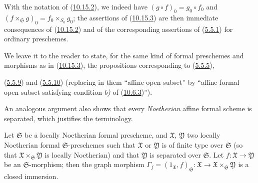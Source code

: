 With the notation of (\hyperref[I.10.15.2]{10.15.2}), we indeed have
$(g\circ f)_0=g_0\circ f_0$ and
$(f\times_{\mathfrak{S}}g)_0=f_0\times_{S_0}g_0$; the assertions of
(\hyperref[I.10.15.3]{10.15.3}) are then immediate consequences of
(\hyperref[I.10.15.2]{10.15.2}) and of the corresponding assertions of
(\hyperref[I.5.5.1]{5.5.1}) for ordinary preschemes.

We leave it to the reader to state, for the same kind of
formal preschemes and morphisms as in
(\hyperref[I.10.15.3]{10.15.3}), the propositions corresponding to
(\hyperref[I.5.5.5]{5.5.5}),

(\hyperref[I.5.5.9]{5.5.9}) and
(\hyperref[I.5.5.10]{5.5.10}) (replacing in them ``affine open subset'' by
``affine formal open subset satisfying condition \emph{b)} of
(\hyperref[I.10.6.3]{10.6.3})'').

An analogous argument also shows that every \emph{Noetherian} affine formal
scheme is separated, which justifies the terminology.

\begin{proposition}[10.15.4]
\label{I.10.15.4}
Let $\mathfrak{S}$ be a locally Noetherian formal prescheme, and
$\mathfrak{X}$, $\mathfrak{Y}$ two locally Noetherian formal
$\mathfrak{S}$-preschemes such that $\mathfrak{X}$ or $\mathfrak{Y}$ is of
finite type over $\mathfrak{S}$ (so that
$\mathfrak{X}\times_{\mathfrak{S}}\mathfrak{Y}$ is locally Noetherian)
and that $\mathfrak{Y}$ is separated over $\mathfrak{S}$. Let
$f:\mathfrak{X}\to\mathfrak{Y}$ be an $\mathfrak{S}$-morphism; then the
graph morphism
$\Gamma_f=(1_{\mathfrak{X}},f)_{\mathfrak{S}}:\mathfrak{X}\to
\mathfrak{X}\times_{\mathfrak{S}}\mathfrak{Y}$ is a closed immersion.
\end{proposition}

